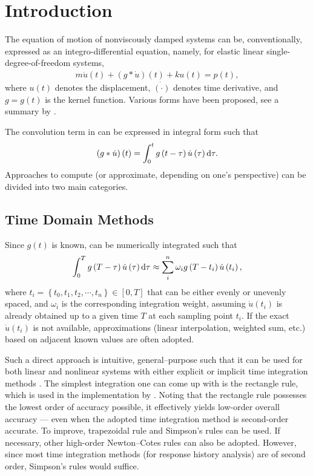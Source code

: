 \section{Introduction}
The equation of motion of nonviscously damped systems can be, conventionally, expressed as an integro-differential equation, namely, for elastic linear single-degree-of-freedom systems,
\begin{gather}\label{eq:single_eom}
m\ddot{u}\left(t\right)+\left(g*\dot{u}\right)\left(t\right)+ku\left(t\right)=p\left(t\right),
\end{gather}
where $u(t)$ denotes the displacement, $\dot{(\cdot)}$ denotes time derivative, and $g=g(t)$ is the kernel function. Various forms have been proposed, see a summary by \citet[][Table 1.1]{Adhikari2014}.

The convolution term in  can be expressed in integral form such that
\begin{gather}\label{eq:conv}
\left(g*\dot{u}\right)\left(t\right)=\int_0^tg\left(t-\tau\right)\dot{u}\left(\tau\right)\mathrm{d}\tau.
\end{gather}
Approaches to compute (or approximate, depending on one's perspective)  can be divided into two main categories.
\subsection{Time Domain Methods}
Since $g(t)$ is known,  can be numerically integrated such that
\begin{gather}
\int_0^Tg\left(T-\tau\right)\dot{u}\left(\tau\right)\mathrm{d}\tau\approx\sum_i^n\omega_ig\left(T-t_i\right)\dot{u}\left(t_i\right),
\end{gather}
where $t_i=\left\{t_0,t_1,t_2,\cdots,t_n\right\}\in[0,T]$ that can be either evenly or unevenly spaced, and $\omega_i$ is the corresponding integration weight, assuming $\dot{u}(t_i)$ is already obtained up to a given time $T$ at each sampling point $t_i$. If the exact $\dot{u}(t_i)$ is not available, approximations (linear interpolation, weighted sum, etc.) based on adjacent known values are often adopted.

Such a direct approach is intuitive, general--purpose such that it can be used for both linear and nonlinear systems with either explicit or implicit time integration methods \citep[see, e.g.,][]{Katsikadelis2019}. The simplest integration one can come up with is the rectangle rule, which is used in the implementation by \citet{Puthanpurayil2014}. Noting that the rectangle rule possesses the lowest order of accuracy possible, it effectively yields low-order overall accuracy --- even when the adopted time integration method is second-order accurate. To improve, trapezoidal rule \citep[see][]{Liu2014} and Simpson's rules \citep[see][]{Shen2019} can be used. If necessary, other high-order Newton--Cotes rules can also be adopted. However, since most time integration methods (for response history analysis) are of second order, Simpson's rules would suffice.


